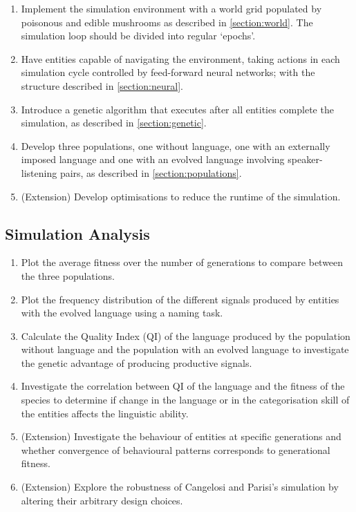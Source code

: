 \documentclass[12pt,a4paper]{report}
\def\switchenum#1{%
  \renewcommand\labelenumi{#1\theenumi.}%
}
\begin{document}
\begin{enumerate}

\item Implement the simulation environment with a world grid populated by poisonous and edible mushrooms as described in \cref{section:world}. The simulation loop should be divided into regular `epochs'.

\item Have entities capable of navigating the environment, taking actions in each simulation cycle controlled by feed-forward neural networks; with the structure described in \cref{section:neural}.

\item Introduce a genetic algorithm that executes after all entities complete the simulation, as described in \cref{section:genetic}.

\item Develop three populations, one without language, one with an externally imposed language and one with an evolved language involving speaker-listening pairs, as described in \cref{section:populations}.
\switchenum{*}
\item (Extension) Develop optimisations to reduce the runtime of the simulation.

\end{enumerate}

\subsection*{Simulation Analysis}

\begin{enumerate}

\item Plot the average fitness over the number of generations to compare between the three populations.

\item Plot the frequency distribution of the different signals produced by entities with the evolved language using a naming task.

\item Calculate the Quality Index (QI) of the language produced by the population without language and the population with an evolved language to investigate the genetic advantage of producing productive signals. 

\item Investigate the correlation between QI of the language and the fitness of the species to determine if change in the language or in the categorisation skill of the entities affects the linguistic ability.
\switchenum{*}
\item (Extension) Investigate the behaviour of entities at specific generations and whether convergence of behavioural patterns corresponds to generational fitness.
\switchenum{*}
\item (Extension) Explore the robustness of Cangelosi and Parisi's simulation by altering their arbitrary design choices.

\end{enumerate}
\end{document}
